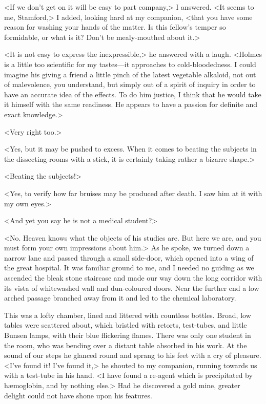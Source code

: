 <If we don't get on it will be easy to part company,> I answered. <It seems to me, Stamford,> I added, looking hard at my companion, <that you have some reason for washing your hands of the matter. Is this fellow's temper so formidable, or what is it? Don't be mealy-mouthed about it.>

<It is not easy to express the inexpressible,> he answered with a laugh. <Holmes is a little too scientific for my tastes—it approaches to cold-bloodedness. I could imagine his giving a friend a little pinch of the latest vegetable alkaloid, not out of malevolence, you understand, but simply out of a spirit of inquiry in order to have an accurate idea of the effects. To do him justice, I think that he would take it himself with the same readiness. He appears to have a passion for definite and exact knowledge.>

<Very right too.>

<Yes, but it may be pushed to excess. When it comes to beating the subjects in the dissecting-rooms with a stick, it is certainly taking rather a bizarre shape.>

<Beating the subjects!>

<Yes, to verify how far bruises may be produced after death. I saw him at it with my own eyes.>

<And yet you say he is not a medical student?>

<No. Heaven knows what the objects of his studies are. But here we are, and you must form your own impressions about him.> As he spoke, we turned down a narrow lane and passed through a small side-door, which opened into a wing of the great hospital. It was familiar ground to me, and I needed no guiding as we ascended the bleak stone staircase and made our way down the long corridor with its vista of whitewashed wall and dun-coloured doors. Near the further end a low arched passage branched away from it and led to the chemical laboratory.

This was a lofty chamber, lined and littered with countless bottles. Broad, low tables were scattered about, which bristled with retorts, test-tubes, and little Bunsen lamps, with their blue flickering flames. There was only one student in the room, who was bending over a distant table absorbed in his work. At the sound of our steps he glanced round and sprang to his feet with a cry of pleasure. <I've found it! I've found it,> he shouted to my companion, running towards us with a test-tube in his hand. <I have found a re-agent which is precipitated by hæmoglobin, and by nothing else.> Had he discovered a gold mine, greater delight could not have shone upon his features.

